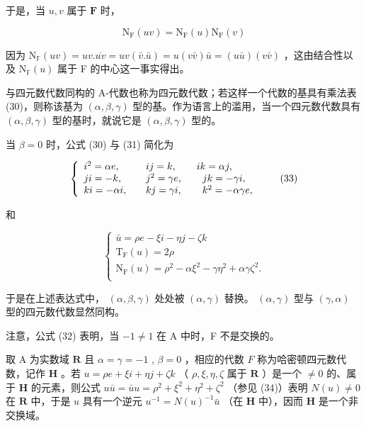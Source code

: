 于是，当 \(u, v\) 属于 \(\mathbf{F}\) 时，

\[
\mathrm{N} _ {\mathrm{F}} (u v) = \mathrm{N} _ {\mathrm{F}} (u) \mathrm{N} _ {\mathrm{F}} (v)\tag{32}
\]

因为 \(\mathrm{N}_{\mathbb{F}}(uv)=uv.\overline{uv}=uv(\bar{v}.\bar{u})=u(v\bar{v})\bar{u}=(u\bar{u})(v\bar{v})\) ，这由结合性以及 \(\mathrm{N}_{\mathbb{F}}(u)\) 属于 F 的中心这一事实得出。

与四元数代数同构的 A-代数也称为四元数代数；若这样一个代数的基具有乘法表 (30)，则称该基为 \((\alpha, \beta, \gamma)\) 型的基。作为语言上的滥用，当一个四元数代数具有 \((\alpha, \beta, \gamma)\) 型的基时，就说它是 \((\alpha, \beta, \gamma)\) 型的。

当 \(\beta = 0\) 时，公式 (30) 与 (31) 简化为

\[
\left\{ \begin{array}{l l} i ^ {2} = \alpha e, & \quad i j = k, \qquad i k = \alpha j, \\ j i = - k, & \quad j ^ {2} = \gamma e, \qquad j k = - \gamma i, \\ k i = - \alpha i, & \quad k j = \gamma i, \qquad k ^ {2} = - \alpha \gamma e, \end{array} \right.\tag{33}
\]

和

\[
\left\{ \begin{array} {c}\bar {u} = \rho e - \xi i - \eta j - \zeta k \\ \mathrm{T} _ {\mathrm{F}} (u) = 2 \rho \\ \mathrm{N} _ {\mathrm{F}} (u) = \rho^ {2} - \alpha \xi^ {2} - \gamma \eta^ {2} + \alpha \gamma \zeta^ {2}. \\ \end{array} \right.\tag{34}
\]

于是在上述表达式中， \((\alpha, \beta, \gamma)\) 处处被 \((\alpha, \gamma)\) 替换。 \((\alpha, \gamma)\) 型与 \((\gamma, \alpha)\) 型的四元数代数显然同构。

注意，公式 (32) 表明，当 \(-1 \neq 1\) 在 A 中时，F 不是交换的。

取 A 为实数域 \(\mathbf{R}\) 且 \(\alpha = \gamma = -1\) , \(\beta = 0\) ，相应的代数 \(F\) 称为哈密顿四元数代数，记作 \(\mathbf{H}\) 。若 \(u = \rho e + \xi i + \eta j + \zeta k\) （ \(\rho, \xi, \eta, \zeta\) 属于 \(\mathbf{R}\) ）是一个 \(\neq 0\) 的、属于 \(\mathbf{H}\) 的元素，则公式 \(u\bar{u} = \bar{u} u = \rho^2 + \xi^2 + \eta^2 + \zeta^2\) （参见 (34)）表明 \(N(u) \neq 0\) 在 \(\mathbf{R}\) 中，于是 \(u\) 具有一个逆元 \(u^{-1} = N(u)^{-1}\bar{u}\) （在 \(\mathbf{H}\) 中），因而 \(\mathbf{H}\) 是一个非交换域。

